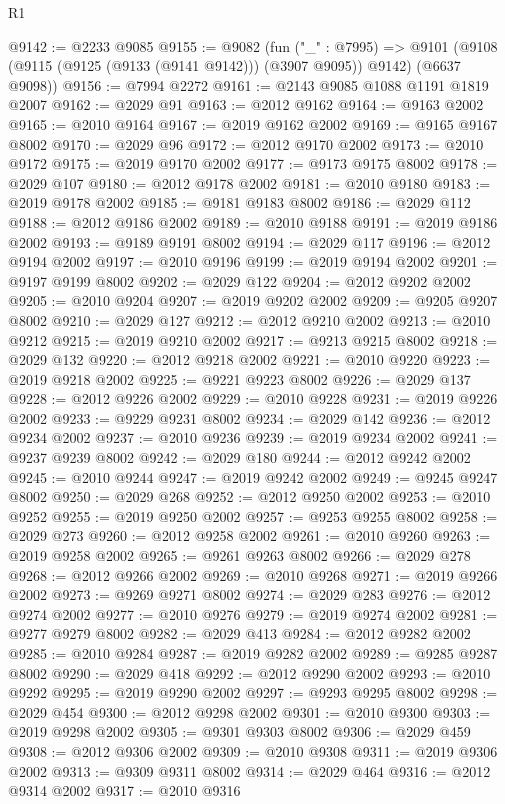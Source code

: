 \begin{lexlean}{R1}
\begin{coremodule}
@9142 := @2233 @9085
@9155 := @9082
    (fun ("_" : @7995) =>
    @9101 (@9108 (@9115 (@9125 (@9133 (@9141 @9142))) (@3907 @9095)) @9142) (@6637 @9098))
@9156 := @7994 @2272
@9161 := @2143 @9085 @1088 @1191 @1819 @2007
@9162 := @2029 @91
@9163 := @2012 @9162
@9164 := @9163 @2002
@9165 := @2010 @9164
@9167 := @2019 @9162 @2002
@9169 := @9165 @9167 @8002
@9170 := @2029 @96
@9172 := @2012 @9170 @2002
@9173 := @2010 @9172
@9175 := @2019 @9170 @2002
@9177 := @9173 @9175 @8002
@9178 := @2029 @107
@9180 := @2012 @9178 @2002
@9181 := @2010 @9180
@9183 := @2019 @9178 @2002
@9185 := @9181 @9183 @8002
@9186 := @2029 @112
@9188 := @2012 @9186 @2002
@9189 := @2010 @9188
@9191 := @2019 @9186 @2002
@9193 := @9189 @9191 @8002
@9194 := @2029 @117
@9196 := @2012 @9194 @2002
@9197 := @2010 @9196
@9199 := @2019 @9194 @2002
@9201 := @9197 @9199 @8002
@9202 := @2029 @122
@9204 := @2012 @9202 @2002
@9205 := @2010 @9204
@9207 := @2019 @9202 @2002
@9209 := @9205 @9207 @8002
@9210 := @2029 @127
@9212 := @2012 @9210 @2002
@9213 := @2010 @9212
@9215 := @2019 @9210 @2002
@9217 := @9213 @9215 @8002
@9218 := @2029 @132
@9220 := @2012 @9218 @2002
@9221 := @2010 @9220
@9223 := @2019 @9218 @2002
@9225 := @9221 @9223 @8002
@9226 := @2029 @137
@9228 := @2012 @9226 @2002
@9229 := @2010 @9228
@9231 := @2019 @9226 @2002
@9233 := @9229 @9231 @8002
@9234 := @2029 @142
@9236 := @2012 @9234 @2002
@9237 := @2010 @9236
@9239 := @2019 @9234 @2002
@9241 := @9237 @9239 @8002
@9242 := @2029 @180
@9244 := @2012 @9242 @2002
@9245 := @2010 @9244
@9247 := @2019 @9242 @2002
@9249 := @9245 @9247 @8002
@9250 := @2029 @268
@9252 := @2012 @9250 @2002
@9253 := @2010 @9252
@9255 := @2019 @9250 @2002
@9257 := @9253 @9255 @8002
@9258 := @2029 @273
@9260 := @2012 @9258 @2002
@9261 := @2010 @9260
@9263 := @2019 @9258 @2002
@9265 := @9261 @9263 @8002
@9266 := @2029 @278
@9268 := @2012 @9266 @2002
@9269 := @2010 @9268
@9271 := @2019 @9266 @2002
@9273 := @9269 @9271 @8002
@9274 := @2029 @283
@9276 := @2012 @9274 @2002
@9277 := @2010 @9276
@9279 := @2019 @9274 @2002
@9281 := @9277 @9279 @8002
@9282 := @2029 @413
@9284 := @2012 @9282 @2002
@9285 := @2010 @9284
@9287 := @2019 @9282 @2002
@9289 := @9285 @9287 @8002
@9290 := @2029 @418
@9292 := @2012 @9290 @2002
@9293 := @2010 @9292
@9295 := @2019 @9290 @2002
@9297 := @9293 @9295 @8002
@9298 := @2029 @454
@9300 := @2012 @9298 @2002
@9301 := @2010 @9300
@9303 := @2019 @9298 @2002
@9305 := @9301 @9303 @8002
@9306 := @2029 @459
@9308 := @2012 @9306 @2002
@9309 := @2010 @9308
@9311 := @2019 @9306 @2002
@9313 := @9309 @9311 @8002
@9314 := @2029 @464
@9316 := @2012 @9314 @2002
@9317 := @2010 @9316

\end{coremodule}
\end{lexlean}
